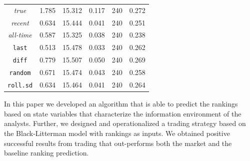 \documentclass[a0paper,portrait]{baposter}\usepackage[]{graphicx}\usepackage[]{color}
\newcommand{\true}{\textit{true}}
\newcommand{\naive}{\textit{recent}}
\newcommand{\default}{\textit{all-time}}
\newcommand{\last}{\texttt{last}}
\newcommand{\diff}{\texttt{diff}}
\newcommand{\random}{\texttt{random}}
\newcommand{\rollsd}{\texttt{roll.sd}}
\begin{document}
\begin{poster}
{\begin{center}
\begin{tabular}{cccccc}
    \midrule
 \true{} & 1.785 & 15.312 & 0.117 &  240 & 0.272 \\ 
  \naive{} & 0.634 & 15.444 & 0.041 &  240 & 0.251 \\ 
  \default{} & 0.587 & 15.325 & 0.038 &  240 & 0.238 \\ 
  \last{} & 0.513 & 15.478 & 0.033 &  240 & 0.262 \\ 
  \diff{} & 0.779 & 15.507 & 0.050 &  240 & 0.269 \\ 
  \random{} & 0.671 & 15.474 & 0.043 &  240 & 0.258 \\ 
  \rollsd{} & 0.634 & 15.464 & 0.041 &  240 & 0.264 \\ 
  
  \bottomrule
  \end{tabular}
  \end{center}
}
{
In this paper we developed an algorithm that is able to predict the rankings based on state variables that characterize the information environment of the analysts. Further, we designed and operationalized a trading strategy based on the Black-Litterman model with rankings as inputs. We obtained positive successful results from trading that out-performs both the market and the baseline ranking prediction.
}





%


\end{poster}
\end{document}
